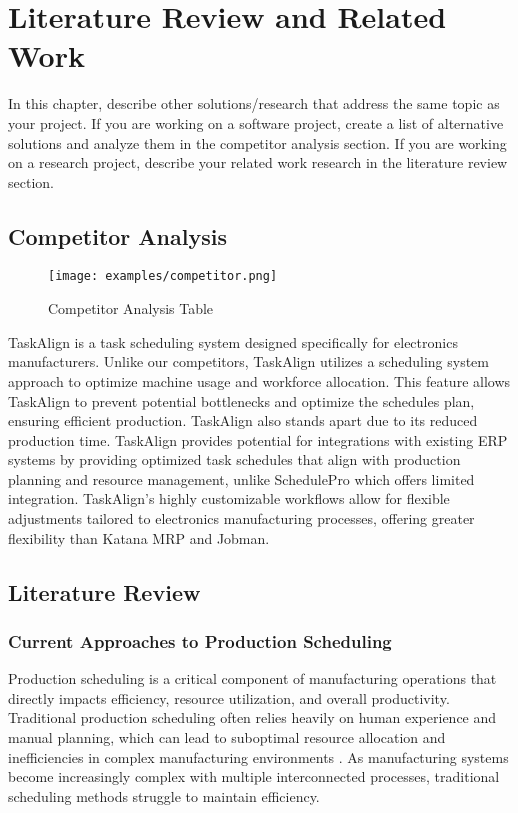 \chapter{Literature Review and Related Work}
\label{chap:relatedworks}

In this chapter, describe other solutions/research that address the
same topic as your project. If you are working on a software project, create a
list of alternative solutions and analyze them in the competitor analysis section.
If you are working on a research project, describe your related work research in
the literature review section.

\section{Competitor Analysis}
\label{section:competitor-analysis}

\begin{figure}[h]
    \centering
    \texttt{[image: examples/competitor.png]}
    \caption{Competitor Analysis Table} 
\end{figure}

TaskAlign is a task scheduling system designed specifically for electronics manufacturers. Unlike our competitors, TaskAlign utilizes a scheduling system approach to optimize machine usage and workforce allocation. This feature allows TaskAlign to prevent potential bottlenecks and optimize the schedules plan, ensuring efficient production. TaskAlign also stands apart due to its reduced production time. TaskAlign provides potential for integrations with existing ERP systems by providing optimized task schedules that align with production planning and resource management, unlike SchedulePro which offers limited integration. TaskAlign's highly customizable workflows allow for flexible adjustments tailored to electronics manufacturing processes, offering greater flexibility than Katana MRP and Jobman.


\section{Literature Review}
\label{section:literature-review}


\subsection{Current Approaches to Production Scheduling}

Production scheduling is a critical component of manufacturing operations that directly impacts efficiency, resource utilization, and overall productivity. Traditional production scheduling often relies heavily on human experience and manual planning, which can lead to suboptimal resource allocation and inefficiencies in complex manufacturing environments \cite{alander2024}. As manufacturing systems become increasingly complex with multiple interconnected processes, traditional scheduling methods struggle to maintain efficiency.

